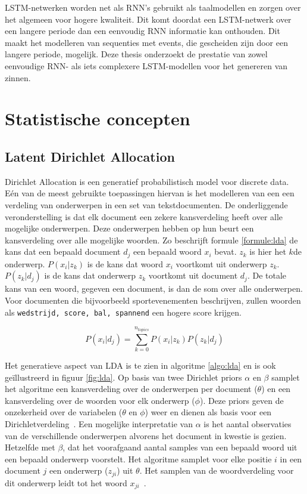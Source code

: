 LSTM-netwerken worden net als RNN's gebruikt als taalmodellen en zorgen over het algemeen voor hogere kwaliteit. Dit komt doordat een LSTM-netwerk over een langere periode dan een eenvoudig RNN informatie kan onthouden. Dit maakt het modelleren van sequenties met events, die gescheiden zijn door een langere periode, mogelijk. Deze thesis onderzoekt de prestatie van zowel eenvoudige RNN- als iets complexere LSTM-modellen voor het genereren van zinnen.


\section{Statistische concepten}

\subsection{Latent Dirichlet Allocation}
Dirichlet Allocation\cite{Blei2012} is een generatief probabilistisch model voor discrete data. E\'en van de meest gebruikte toepassingen hiervan is het modelleren van een een verdeling van onderwerpen in een set van tekstdocumenten. De onderliggende veronderstelling is dat elk document een zekere kansverdeling heeft over alle mogelijke onderwerpen. Deze onderwerpen hebben op hun beurt een kansverdeling over alle mogelijke woorden. Zo beschrijft formule \eqref{formule:lda} de kans dat een bepaald document $d_j$ een bepaald woord $x_i$ bevat. $z_k$ is hier het $k$de onderwerp. $P(x_i|z_k)$ is de kans dat woord $x_i$ voortkomt uit onderwerp $z_k$. $P(z_k|d_j)$ is de kans dat onderwerp $z_k$ voortkomt uit document $d_j$. De totale kans van een woord, gegeven een document, is dan de som over alle onderwerpen. Voor documenten die bijvoorbeeld sportevenementen beschrijven, zullen woorden als \texttt{wedstrijd, score, bal, spannend} een hogere score krijgen.

\begin{equation}
P(x_i | d_j) = \sum\limits_{k=0}^{n_{topics}}P(x_i|z_k)P(z_k|d_j)
\label{formule:lda}
\end{equation}

Het generatieve aspect van LDA is te zien in algoritme \ref{algo:lda} en is ook ge\"illustreerd in figuur \ref{fig:lda}. Op basis van twee Dirichlet priors $\alpha$ en $\beta$ samplet het algoritme een kansverdeling over de onderwerpen per document ($\theta$) en een kansverdeling over de woorden voor elk onderwerp ($\phi$). Deze priors geven de onzekerheid over de variabelen ($\theta$ en $\phi$) weer en dienen als basis voor een Dirichletverdeling~\cite{Huang2005}. Een mogelijke interpretatie van $\alpha$ is het aantal observaties van de verschillende onderwerpen alvorens het document in kwestie is gezien. Hetzelfde met $\beta$, dat het voorafgaand aantal samples van een bepaald woord uit een bepaald onderwerp voorstelt. Het algoritme samplet voor elke positie $i$ in een document $j$ een onderwerp ($z_{ji}$) uit $\theta$. Het samplen van de woordverdeling voor dit onderwerp leidt tot het woord $x_{ji}$~\cite{LDAsien}.

